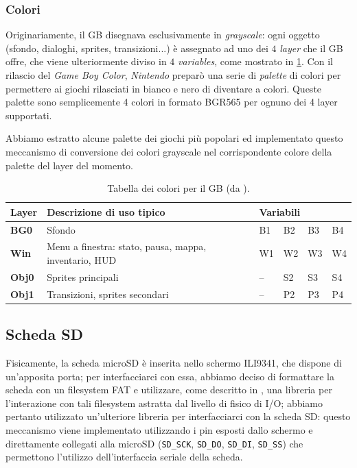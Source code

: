 \documentclass[hidelinks,12pt]{article}
\begin{document}
\subsubsection{Colori}
Originariamente, il GB disegnava esclusivamente in \textit{grayscale}: ogni
oggetto (sfondo, dialoghi, sprites, transizioni...) è assegnato ad uno dei $4$
\textit{layer} che il GB offre, che viene ulteriormente diviso in $4$
\textit{variables}, come mostrato in \cref{table:gb_colors}.
Con il rilascio del \textit{Game Boy Color}, \textit{Nintendo} preparò una serie
di \textit{palette} di colori per permettere ai giochi rilasciati in bianco e nero
di diventare a colori. Queste palette sono semplicemente 4 colori in formato BGR565
per ognuno dei 4 layer supportati.

Abbiamo estratto alcune palette dei giochi più popolari ed implementato questo
meccanismo di conversione dei colori grayscale nel corrispondente colore della
palette del layer del momento.

\begin{table}[h]
	\begin{tabular}{|l|l|llll|}
		\hline
		\textbf{Layer} & \textbf{Descrizione di uso tipico}                    & \multicolumn{4}{l|}{\textbf{Variabili}}                                                          \\ \hline
		\textbf{BG0}   & Sfondo                                                & \multicolumn{1}{l|}{B1}                 & \multicolumn{1}{l|}{B2} & \multicolumn{1}{l|}{B3} & B4 \\ \hline
		\textbf{Win}   & Menu a finestra: stato, pausa, mappa, inventario, HUD & \multicolumn{1}{l|}{W1}                 & \multicolumn{1}{l|}{W2} & \multicolumn{1}{l|}{W3} & W4 \\ \hline
		\textbf{Obj0}  & Sprites principali                                    & \multicolumn{1}{l|}{–}                  & \multicolumn{1}{l|}{S2} & \multicolumn{1}{l|}{S3} & S4 \\ \hline
		\textbf{Obj1}  & Transizioni, sprites secondari                        & \multicolumn{1}{l|}{–}                  & \multicolumn{1}{l|}{P2} & \multicolumn{1}{l|}{P3} & P4 \\ \hline
	\end{tabular}
	\caption{Tabella dei colori per il GB (da
		\cite{GameBoyColors}).}
	\label{table:gb_colors}
\end{table}

\subsection{Scheda SD}
Fisicamente, la scheda microSD è inserita nello schermo ILI9341, che dispone di
un'apposita porta; per interfacciarci con essa, abbiamo deciso di formattare la
scheda con un filesystem FAT e utilizzare, come descritto in \cite{stm1721}, una
libreria per l'interazione con tali filesystem astratta dal livello di fisico di
I/O; abbiamo pertanto utilizzato un'ulteriore libreria per interfacciarci con
la scheda SD: questo meccanismo viene implementato utilizzando i pin esposti
dallo schermo e direttamente collegati alla microSD (\texttt{SD\_SCK},
\texttt{SD\_DO}, \texttt{SD\_DI}, \texttt{SD\_SS}) che permettono l'utilizzo
dell'interfaccia seriale della scheda.
\end{document}
